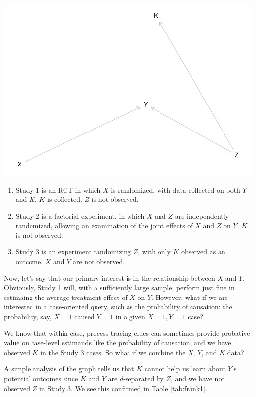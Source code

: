 \documentclass[
  12pt,
]{book}
\providecommand{\tightlist}{%
  \setlength{\itemsep}{0pt}\setlength{\parskip}{0pt}}
\begin{document}
\begin{center}\includegraphics{ii_files/figure-latex/jigsaw-1} \end{center}

\begin{enumerate}
\def\labelenumi{\arabic{enumi}.}
\tightlist
\item
  Study 1 is an RCT in which \(X\) is randomized, with data collected on both \(Y\) and \(K\). \(K\) is collected. \(Z\) is not observed.
\item
  Study 2 is a factorial experiment, in which \(X\) and \(Z\) are independently randomized, allowing an examination of the joint effects of \(X\) and \(Z\) on \(Y\). \(K\) is not observed.
\item
  Study 3 is an experiment randomizing \(Z\), with only \(K\) observed as an outcome. \(X\) and \(Y\) are not observed.
\end{enumerate}

Now, let's say that our primary interest is in the relationship between \(X\) and \(Y\). Obviously, Study 1 will, with a sufficiently large sample, perform just fine in estimaing the average treatment effect of \(X\) on \(Y\). However, what if we are interested in a case-oriented query, such as the probability of causation: the probability, say, \(X=1\) caused \(Y=1\) in a given \(X=1, Y=1\) case?

We know that within-case, process-tracing clues can sometimes provide probative value on case-level estimands like the probability of causation, and we have observed \(K\) in the Study 3 cases. So what if we combine the \(X\), \(Y\), and \(K\) data?

A simple analysis of the graph tells us that \(K\) cannot help us learn about \(Y\)'s potential outcomes since \(K\) and \(Y\) are \(d\)-separated by \(Z\), and we have not observed \(Z\) in Study 3. We see this confirmed in Table \ref{tab:frank1}.
\end{document}
